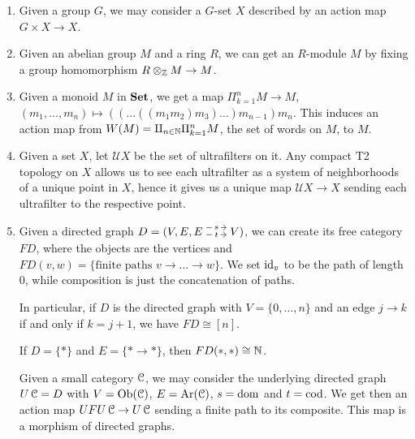 \documentclass[a4paper,11pt,oneside,openany]{scrbook}
\begin{document}
\begin{exmp}
	\begin{enumerate}
		\item Given a group $G$, we may consider a $G$-set $X$ described by an action map $G\times X\rightarrow X$.
		\item Given an abelian group $M$ and a ring $R$, we can get an $R$-module $M$ by fixing a group homomorphism $R\otimes_{\operatorname{\mathbb{Z}}} M\rightarrow M$.
		\item Given a monoid $M$ in ${\normalfont\textbf{Set}}$, we get a map $\Pi_{k=1}^n M\rightarrow M$, $(m_1,\ldots,m_n)\mapsto ((\ldots ((m_1m_2)m_3)\ldots )m_{n-1}) m_n$. This induces an action map from $W(M)=\amalg_{n\in\operatorname{\mathbb{N}}}\Pi_{k=1}^n M$, the set of words on $M$, to $M$.
		\item\label{ultrafilters}
		      Given a set $X$, let $\mathcal{U}X$ be the set of ultrafilters on it. Any compact T2 topology on $X$ allows us to see each ultrafilter as a system of neighborhoods of a unique point in $X$, hence it gives us a unique map $\mathcal{U}X\rightarrow X$ sending each ultrafilter to the respective point.
		\item Given a directed graph $D=(V,E,\hspace{-1.5mm}\begin{tikzcd}
				      E\hspace{-1.5mm}\arrow[r, "t" description,  shift right=.5ex, shorten <= .3em, shorten >= .3em]  \arrow[r, "s" description, shift left=1ex, shorten <= .3em, shorten >= .3em] & \hspace{-1.5mm}V
			      \end{tikzcd}\hspace{-1.5mm})$, we can create its free category $FD$, where the objects are the vertices and $FD(v,w)=\{\text{finite paths } v\rightarrow\ldots\rightarrow w\}$. We set $\operatorname{id}_v$ to be the path of length 0, while composition is just the concatenation of paths.

		      In particular, if $D$ is the directed graph with $V=\{0,\ldots,n\}$ and an edge $j\rightarrow k$ if and only if $k=j+1$, we have $FD\cong [n]$.

		      If $D=\{*\}$ and $E=\{*\rightarrow *\}$, then $FD(*,*)\cong\operatorname{\mathbb{N}}$.

		      Given a small category $\operatorname{\mathcal{C}}$, we may consider the underlying
		      directed graph $U\operatorname{\mathcal{C}}=D$
		      with $V=\operatorname{Ob}(\operatorname{\mathcal{C}})$, $E=\operatorname{Ar}(\operatorname{\mathcal{C}})$, $s=\operatorname{dom}$ and $t=\operatorname{cod}$. We get then an
		      action map $UFU\operatorname{\mathcal{C}}\rightarrow U\operatorname{\mathcal{C}}$ sending a finite path to its
		      composite. This map is a morphism of directed graphs.
	\end{enumerate}
\end{exmp}
\end{document}
